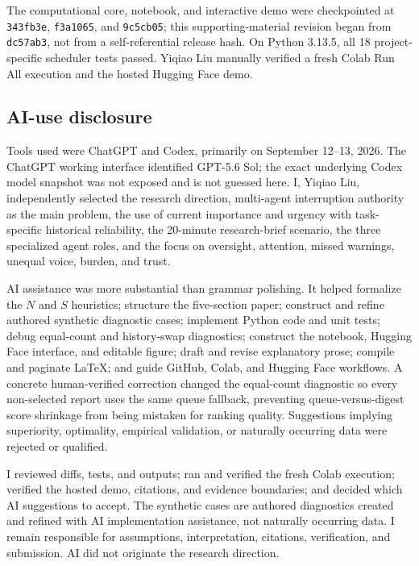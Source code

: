The computational core, notebook, and interactive demo were checkpointed at \texttt{343fb3e}, \texttt{f3a1065}, and \texttt{9c5cb05}; this supporting-material revision began from \texttt{dc57ab3}, not from a self-referential release hash. On Python 3.13.5, all 18 project-specific scheduler tests passed. Yiqiao Liu manually verified a fresh Colab Run All execution and the hosted Hugging Face demo.
\par
\endgroup

\subsection{AI-use disclosure}
Tools used were ChatGPT and Codex, primarily on September 12--13, 2026. The ChatGPT working interface identified GPT-5.6 Sol; the exact underlying Codex model snapshot was not exposed and is not guessed here. I, Yiqiao Liu, independently selected the research direction, multi-agent interruption authority as the main problem, the use of current importance and urgency with task-specific historical reliability, the 20-minute research-brief scenario, the three specialized agent roles, and the focus on oversight, attention, missed warnings, unequal voice, burden, and trust.

AI assistance was more substantial than grammar polishing. It helped formalize the $N$ and $S$ heuristics; structure the five-section paper; construct and refine authored synthetic diagnostic cases; implement Python code and unit tests; debug equal-count and history-swap diagnostics; construct the notebook, Hugging Face interface, and editable figure; draft and revise explanatory prose; compile and paginate LaTeX; and guide GitHub, Colab, and Hugging Face workflows. A concrete human-verified correction changed the equal-count diagnostic so every non-selected report uses the same queue fallback, preventing queue-versus-digest score shrinkage from being mistaken for ranking quality. Suggestions implying superiority, optimality, empirical validation, or naturally occurring data were rejected or qualified.

I reviewed diffs, tests, and outputs; ran and verified the fresh Colab execution; verified the hosted demo, citations, and evidence boundaries; and decided which AI suggestions to accept. The synthetic cases are authored diagnostics created and refined with AI implementation assistance, not naturally occurring data. I remain responsible for assumptions, interpretation, citations, verification, and submission. AI did not originate the research direction.

